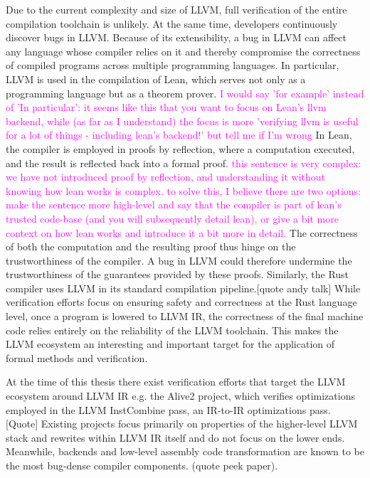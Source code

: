 Due to the current complexity and size of LLVM, full verification of the entire compilation toolchain is unlikely. 
At the same time, developers continuously discover bugs in LLVM. 
Because of its extensibility, a bug in LLVM can affect any language whose compiler relies on it and 
thereby compromise the correctness of compiled programs across multiple programming languages.
In particular, LLVM is used in the compilation of Lean, which serves not only as a programming language but  
as a theorem prover. \textcolor{magenta}{I would say 'for example' instead of 'In particular': 
it seems like this that you want to focus on Lean's llvm backend, while (as far as I understand) 
the focus is more 'verifying llvm is useful for a lot of things - including lean's backend!' 
but tell me if I'm wrong}
In Lean, the compiler is employed in proofs by reflection, where a computation  executed, and the 
result is reflected back into a formal proof. \textcolor{magenta}{this sentence is very complex: 
we have not introduced proof by reflection, and understanding it without knowing how lean works is complex. 
to solve this, I believe there are two options: make the sentence more high-level and say that the compiler
is part of lean's trusted code-base (and you will subsequently detail lean), or give a bit more context on how lean works and 
introduce it a bit more in detail.}
The correctness of both the computation and the resulting proof thus hinge on the trustworthiness of the compiler. 
A bug in LLVM could therefore undermine the trustworthiness of the guarantees provided by these proofs. 
Similarly, the Rust compiler uses LLVM in its standard compilation pipeline.[quote andy talk] 
While verification efforts focus on ensuring safety and correctness at the Rust language level, 
once a program is lowered to LLVM IR, the correctness of the final machine code relies entirely on 
the reliability of the LLVM toolchain. 
This makes the LLVM ecosystem an interesting and important target for the application of formal methods and verification.


At the time of this thesis there exist verification efforts that target the LLVM ecosystem around LLVM IR e.g. 
the Alive2 project, which verifies optimizations employed in the LLVM InstCombine pass, an IR-to-IR optimizations pass. [Quote]
Existing projects focus primarily on properties of the higher-level LLVM stack and rewrites within LLVM IR itself and 
do not focus on the lower ends. 
Meanwhile, backends and low-level assembly code transformation are known to be the most bug-dense compiler components. 
(quote peek paper). 

